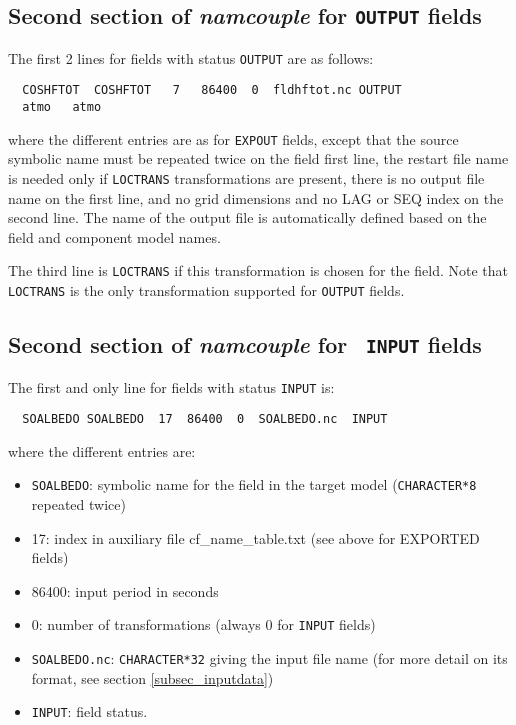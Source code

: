 \subsection{Second section of {\it namcouple} for {\tt OUTPUT} fields}
\label{subsubsec_secondOUTPUT}
  The first 2 lines for fields with status {\tt OUTPUT} are as follows:
  \begin{verbatim}
  COSHFTOT  COSHFTOT   7   86400  0  fldhftot.nc OUTPUT 
  atmo   atmo 
  \end{verbatim}
\vspace{-0.2cm}
where the different entries are as for {\tt EXPOUT} fields, except
that the source symbolic name must be repeated twice on the field
first line, the restart file name is needed only if {\tt LOCTRANS}
transformations are present, there is no output file
name on the first line, and no grid dimensions and no LAG or SEQ index on the second line.
The name of the output file is automatically defined based on the field and component model names.

The third line is {\tt LOCTRANS} if this transformation is chosen for
the field. Note that {\tt LOCTRANS} is the only transformation
supported for {\tt OUTPUT} fields.

\subsection{Second section of {\it namcouple} for {\tt
  INPUT} fields}
\label{subsubsec_secondINPUT}

  The first and only line for fields with status {\tt INPUT} is:

  \begin{verbatim}
  SOALBEDO SOALBEDO  17  86400  0  SOALBEDO.nc  INPUT\end{verbatim}
\vspace{-0.2cm}
 where the different entries are:
  \begin{itemize}
  \item  {\tt SOALBEDO}: symbolic name for the field in the target
  model ({\tt CHARACTER*8} repeated twice)
  \item 17:  index in auxiliary file cf\_name\_table.txt (see above for EXPORTED fields)
  \item 86400: input period in seconds
  \item 0: number of transformations (always 0 for {\tt INPUT} fields)
  \item {\tt SOALBEDO.nc}: {\tt CHARACTER*32} giving the input file
  name (for more detail on its format, see section
  \ref{subsec_inputdata})
  \item {\tt INPUT}: field status.
  \end{itemize}

